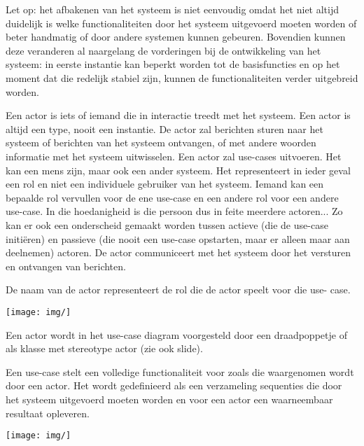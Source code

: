 Let op: het afbakenen van het systeem is niet eenvoudig omdat het niet altijd duidelijk is welke functionaliteiten door het systeem uitgevoerd moeten worden of beter handmatig of door andere systemen kunnen gebeuren. Bovendien kunnen deze veranderen al naargelang de vorderingen bij de ontwikkeling van het systeem: in eerste instantie kan beperkt worden tot de basisfuncties en op het moment dat die redelijk stabiel zijn, kunnen de functionaliteiten verder uitgebreid worden.


Een actor is iets of iemand die in interactie treedt met het systeem. Een actor is altijd een type, nooit een instantie. De actor zal berichten sturen naar het systeem of berichten van het systeem ontvangen, of met andere woorden informatie met het systeem uitwisselen. Een actor zal use-cases uitvoeren. Het kan een mens zijn, maar ook een ander systeem. Het representeert in ieder geval een rol en niet een individuele gebruiker van het systeem. Iemand kan een bepaalde rol vervullen voor de ene use-case en een andere rol voor een andere use-case. In die hoedanigheid is die persoon dus in feite meerdere actoren... Zo kan er ook een onderscheid gemaakt worden tussen actieve (die de use-case initiëren) en passieve (die nooit een use-case opstarten, maar er alleen maar aan deelnemen) actoren.
De actor communiceert met het systeem door het versturen en ontvangen van berichten.

De naam van de actor representeert de rol die de actor speelt voor die use- case.


\begin{center}
\texttt{[image: img/]}%
\label{labelname}%
\end{center}

Een actor wordt in het use-case diagram voorgesteld door een draadpoppetje of als klasse met stereotype actor (zie ook slide).


Een use-case stelt een volledige functionaliteit voor zoals die waargenomen wordt door een actor. Het wordt gedefinieerd als een verzameling sequenties die door het systeem uitgevoerd moeten worden en voor een actor een waarneembaar resultaat opleveren.


\begin{center}
\texttt{[image: img/]}%
\label{labelname}%
\end{center}

